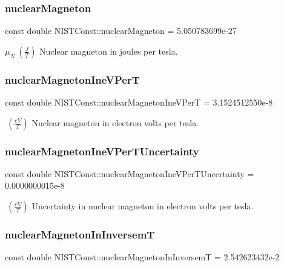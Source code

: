 \subsubsection{\texorpdfstring{nuclear\+Magneton}{nuclearMagneton}}
{\footnotesize\ttfamily const double N\+I\+S\+T\+Const\+::nuclear\+Magneton = 5.\+050783699e-\/27}

$\mu_N \ (\frac{J}{T})$ Nuclear magneton in joules per tesla. \mbox{\label{group___nuclear_magneton_ga5a31a1865923a1c14cd7f22c8973186e}} 
\subsubsection{\texorpdfstring{nuclear\+Magneton\+Ine\+V\+PerT}{nuclearMagnetonIneVPerT}}
{\footnotesize\ttfamily const double N\+I\+S\+T\+Const\+::nuclear\+Magneton\+Ine\+V\+PerT = 3.\+1524512550e-\/8}

$ \ (\frac{eV}{T})$ Nuclear magneton in electron volts per tesla. \mbox{\label{group___nuclear_magneton_gad4934d98a9f09cb4bae556e2aa11ff84}} 
\subsubsection{\texorpdfstring{nuclear\+Magneton\+Ine\+V\+Per\+T\+Uncertainty}{nuclearMagnetonIneVPerTUncertainty}}
{\footnotesize\ttfamily const double N\+I\+S\+T\+Const\+::nuclear\+Magneton\+Ine\+V\+Per\+T\+Uncertainty = 0.\+0000000015e-\/8}

$ \ (\frac{eV}{T})$ Uncertainty in nuclear magneton in electron volts per tesla. \mbox{\label{group___nuclear_magneton_ga2bb8e56daaa602b5097d38b2d1ca32ad}} 
\subsubsection{\texorpdfstring{nuclear\+Magneton\+In\+InversemT}{nuclearMagnetonInInversemT}}
{\footnotesize\ttfamily const double N\+I\+S\+T\+Const\+::nuclear\+Magneton\+In\+InversemT = 2.\+542623432e-\/2}

